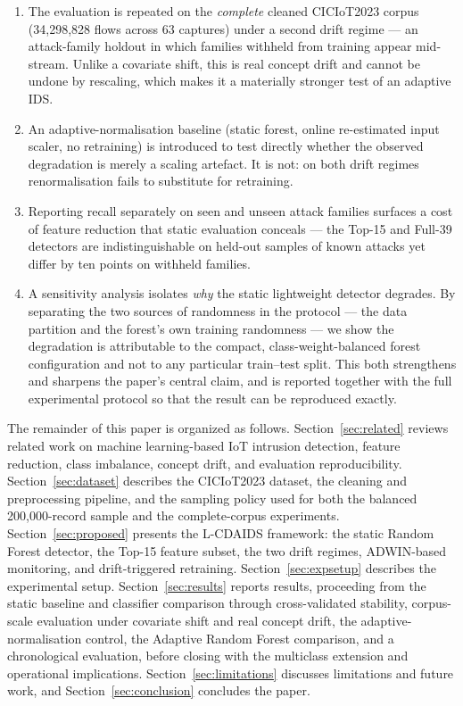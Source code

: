 \documentclass[11pt,a4paper]{article}
\begin{document}
\begin{enumerate}
        the stream $25.3\times$ faster, which is the trade the target
        deployment is written against.
  \item The evaluation is repeated on the \emph{complete} cleaned
        CICIoT2023 corpus (34{,}298{,}828 flows across 63 captures) under a
        second drift regime --- an attack-family holdout in which families
        withheld from training appear mid-stream. Unlike a covariate shift,
        this is real concept drift and cannot be undone by rescaling, which
        makes it a materially stronger test of an adaptive IDS.
  \item An adaptive-normalisation baseline (static forest, online re-estimated
        input scaler, no retraining) is introduced to test directly whether the
        observed degradation is merely a scaling artefact. It is not: on both
        drift regimes renormalisation fails to substitute for retraining.
  \item Reporting recall separately on seen and unseen attack families surfaces
        a cost of feature reduction that static evaluation conceals --- the
        Top-15 and Full-39 detectors are indistinguishable on held-out samples of
        known attacks yet differ by ten points on withheld families.
  \item A sensitivity analysis isolates \emph{why} the static
        lightweight detector degrades. By separating the two sources of
        randomness in the protocol --- the data partition and the
        forest's own training randomness --- we show the degradation is
        attributable to the compact, class-weight-balanced forest
        configuration and not to any particular train--test split. This
        both strengthens and sharpens the paper's central claim, and is
        reported together with the full experimental protocol so that
        the result can be reproduced exactly.
\end{enumerate}

The remainder of this paper is organized as follows. Section~\ref{sec:related}
reviews related work on machine learning-based IoT intrusion detection, feature
reduction, class imbalance, concept drift, and evaluation reproducibility.
Section~\ref{sec:dataset} describes the CICIoT2023 dataset, the cleaning and
preprocessing pipeline, and the sampling policy used for both the balanced
200{,}000-record sample and the complete-corpus experiments. Section~\ref{sec:proposed}
presents the L-CDAIDS framework: the static Random Forest detector, the Top-15
feature subset, the two drift regimes, ADWIN-based monitoring, and
drift-triggered retraining. Section~\ref{sec:expsetup} describes the
experimental setup. Section~\ref{sec:results} reports results, proceeding from
the static baseline and classifier comparison through cross-validated
stability, corpus-scale evaluation under covariate shift and real concept
drift, the adaptive-normalisation control, the Adaptive Random Forest
comparison, and a chronological evaluation, before closing with the multiclass
extension and operational implications. Section~\ref{sec:limitations}
discusses limitations and future work, and Section~\ref{sec:conclusion}
concludes the paper.
\end{document}
